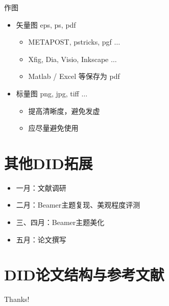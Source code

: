 \documentclass[aspectratio=169]{beamer}
\begin{document}
\begin{frame}{作图}
    \begin{itemize}
        \item 矢量图 eps, ps, pdf
        \begin{itemize}
            \item METAPOST, pstricks, pgf $\ldots$
            \item Xfig, Dia, Visio, Inkscape $\ldots$
            \item Matlab / Excel 等保存为 pdf
        \end{itemize}
        \item 标量图 png, jpg, tiff $\ldots$
        \begin{itemize}
            \item 提高清晰度，避免发虚
            \item 应尽量避免使用
        \end{itemize}
    \end{itemize}
\end{frame}

\section{其他DID拓展}
\begin{frame}
    \begin{itemize}
        \item 一月：文献调研
        \item 二月：Beamer主题复现、美观程度评测
        \item 三、四月：Beamer主题美化
        \item 五月：论文撰写
    \end{itemize}
\end{frame}

\section{DID论文结构与参考文献}

\begin{frame}[allowframebreaks]
    
    
\end{frame}

\begin{frame}
    \begin{center}
        {\Huge\calligra Thanks!}
    \end{center}
\end{frame}
\end{document}
